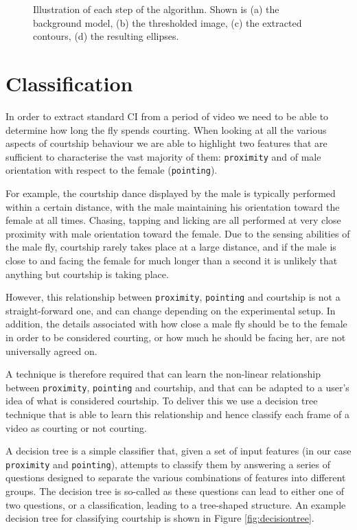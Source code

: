 \documentclass{article}
\newcommand{\var}[1]{\texttt{#1}}
\begin{document}
\begin{figure}
	
	\caption{Illustration of each step of the algorithm. Shown is (a) the background model, (b) the thresholded image, (c) the extracted contours, (d) the resulting ellipses.}
	\label{fig:tracking}
\end{figure}

\section{Classification}
\label{sec:classification}

In order to extract standard CI from a period of video we need to be able to determine how long the fly spends courting. When looking at all the various aspects of courtship behaviour we are able to highlight two features that are sufficient to characterise the vast majority of them: \var{proximity} and of male orientation with respect to the female (\var{pointing}).

For example, the courtship dance displayed by the male is typically performed within a certain distance, with the male maintaining his orientation toward the female at all times. Chasing, tapping and licking are all performed at very close proximity with male orientation toward the female. Due to the sensing abilities of the male fly, courtship rarely takes place at a large distance, and if the male is close to and facing the female for much longer than a second it is unlikely that anything but courtship is taking place.

However, this relationship between \var{proximity}, \var{pointing} and courtship is not a straight-forward one, and can change depending on the experimental setup. In addition, the details associated with how close a male fly should be to the female in order to be considered courting, or how much he should be facing her, are not universally agreed on.

A technique is therefore required that can learn the non-linear relationship between \var{proximity}, \var{pointing} and courtship, and that can be adapted to a user's idea of what is considered courtship. To deliver this we use a decision tree technique that is able to learn this relationship and hence classify each frame of a video as courting or not courting.

A decision tree is a simple classifier that, given a set of input features (in our case \var{proximity} and \var{pointing}), attempts to classify them by answering a series of questions designed to separate the various combinations of features into different groups. The decision tree is so-called as these questions can lead to either one of two questions, or a classification, leading to a tree-shaped structure. An example decision tree for classifying courtship is shown in Figure \ref{fig:decisiontree}.
\end{document}
